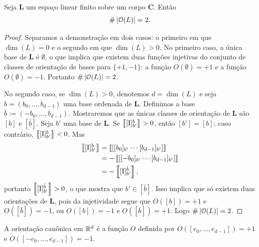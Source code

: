 \begin{proposition}
Seja $\bm L$ um espaço linear finito sobre um corpo $\bm C$. Então
	\begin{equation*}
	\#\left\lvert{\mathcal{O}(L)}\right\rvert = 2.
	\end{equation*}
\end{proposition}
\begin{proof}
Separamos a demonstração em dois casos: o primeiro em que $\dim(L) = 0$ e o segundo em que $\dim(L) > 0$. No primeiro caso, a única base de $\bm L$ é $\emptyset$, o que implica que existem duas funções injetivas do conjunto de classes de orientação de bases para $\{+1,-1\}$: a função $O(\emptyset) = +1$ e a função $O(\emptyset) = -1$. Portanto $\#\left\lvert{\mathcal{O}(L)}\right\rvert=2$.

No segundo caso, se $\dim(L)>0$, denotemos $d = \dim(L)$ e seja $b = (b_0,\ldots,b_{d-1})$ uma base ordenada de $\bm L$. Definimos a base $\bar b := (-b_0,\ldots,b_{d-1})$. Mostraremos que as únicas classes de orientação de $\bm L$ são $[b]$ e $[\bar b]$. Seja $b'$ uma base de $\bm L$. Se $\left\llbracket{[\mathrm{I}]^b_{b'}}\right\rrbracket > 0$, então $[b'] = [b]$; caso contrário, $\left\llbracket{[\mathrm{I}]^b_{b'}}\right\rrbracket < 0$. Mas
	\begin{align*}
	\left\llbracket{[\mathrm{I}]^b_{b'}}\right\rrbracket &= \left\llbracket{[[b_0]_{b'} \cdots [b_{d-1}]_{b'}]}\right\rrbracket \\
	&=	- \left\llbracket{[[-b_0]_{b'} \cdots [b_{d-1}]_{b'}]}\right\rrbracket \\
	&= -\left\llbracket{[\mathrm{I}]^{\bar b}_{b'}}\right\rrbracket,
	\end{align*}
portanto $\left\llbracket{[\mathrm{I}]^{\bar b}_{b'}}\right\rrbracket > 0$, o que mostra que $b' \in [\bar b]$. Isso implica que só existem duas orientações de $\bm L$, pois da injetividade segue que $O([b])=+1$ e $O([\bar b])=-1$, ou $O([b])=-1$ e $O([\bar b])=+1$. Logo $\#\left\lvert{\mathcal{O}(L)}\right\rvert=2$.
\end{proof}

A orientação canônica em $\mathbb{R}^d$ é a função $O$ definida por $O([e_0,\ldots,e_{d-1}]) = +1$ e $O([-e_0,\ldots,e_{d-1}]) = -1$.


